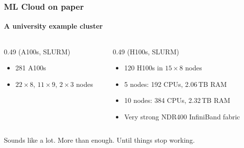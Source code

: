 \documentclass[10pt,aspectratio=169,notheorems]{beamer}
\begin{document}
\begin{frame}
    \frametitle{ML Cloud on paper}
    \framesubtitle{A university example cluster}
    \begin{columns}[t]
        \begin{column}{0.49\textwidth}
         (A100s, SLURM)
        \begin{itemize}
            \item 281 A100s
            \item $22 \times 8$, $11 \times 9$, $2 \times 3$ nodes
        \end{itemize}
        \end{column}

        \begin{column}{0.49\textwidth}
         (H100s, SLURM)
        \begin{itemize}
            \item 120 H100s in $15 \times 8$ nodes
            \item 5 nodes: 192 CPUs, 2.06\,TB RAM
            \item 10 nodes: 384 CPUs, 2.32\,TB RAM
            \item Very strong NDR400 InfiniBand fabric
        \end{itemize}
        \end{column}
    \end{columns}
    \vspace{2em}
    \textcolor{SlidemintMuted}{Sounds like a lot. More than enough. Until things stop working.}
\end{frame}


\end{document}

